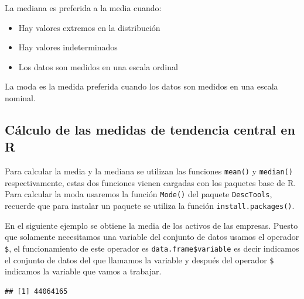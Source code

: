 \documentclass[letterpaper,]{book}
\newenvironment{Shaded}{\begin{snugshade}}{\end{snugshade}}
\newcommand{\KeywordTok}[1]{\textcolor[rgb]{0.13,0.29,0.53}{\textbf{#1}}}
\newcommand{\NormalTok}[1]{#1}
\newcommand{\OperatorTok}[1]{\textcolor[rgb]{0.81,0.36,0.00}{\textbf{#1}}}
\providecommand{\tightlist}{%
  \setlength{\itemsep}{0pt}\setlength{\parskip}{0pt}}
\begin{document}
La mediana es preferida a la media cuando:

\begin{itemize}
\tightlist
\item
  Hay valores extremos en la distribución
\item
  Hay valores indeterminados
\item
  Los datos son medidos en una escala ordinal
\end{itemize}

La moda es la medida preferida cuando los datos son medidos en una escala nominal.

\hypertarget{calculo-de-las-medidas-de-tendencia-central-en-r}{%
\subsection{Cálculo de las medidas de tendencia central en R}\label{calculo-de-las-medidas-de-tendencia-central-en-r}}

Para calcular la media y la mediana se utilizan las funciones \texttt{mean()} y \texttt{median()} respectivamente, estas dos funciones vienen cargadas con los paquetes base de R. Para calcular la moda usaremos la función \texttt{Mode()} del paquete \texttt{DescTools}, recuerde que para instalar un paquete se utiliza la función \texttt{install.packages()}.

En el siguiente ejemplo se obtiene la media de los activos de las empresas. Puesto que solamente necesitamos una variable del conjunto de datos usamos el operador \texttt{\$}, el funcionamiento de este operador es \texttt{data.frame\$variable} es decir indicamos el conjunto de datos del que llamamos la variable y después del operador \texttt{\$} indicamos la variable que vamos a trabajar.

\begin{Shaded}
\end{Shaded}

\begin{verbatim}
## [1] 44064165
\end{verbatim}

\begin{Shaded}
\end{Shaded}
\end{document}
